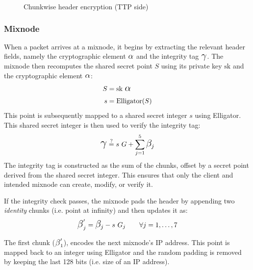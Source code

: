 \begin{figure}[H]
    \centering
    \resizebox{0.9\linewidth}{!}{}
    \caption{Chunkwise header encryption (TTP side)}
    \label{fig:chunked_schema}
\end{figure}


\subsubsection{Mixnode}


When a packet arrives at a mixnode, it begins by extracting the relevant header fields, namely the cryptographic element $ \ALPHA $ and the integrity tag $ \GAMMA $.  
The mixnode then recomputes the shared secret point $ S $ using its private key $ \text{sk} $ and the cryptographic element $ \ALPHA $:  
\begin{equation}
\begin{aligned}
    S &= \text{sk} \ \ALPHA \\
    s &= \text{Elligator}(S)\\
\end{aligned}
\label{eq:derive_secret}
\end{equation}
This point is subsequently mapped to a shared secret integer $ s $ using Elligator.
This shared secret integer is then used to verify the integrity tag: 
\begin{equation}
\GAMMA \overset{\text{?}}{=} s \ G + \sum_{j=1}^{5} \BETA_j
\label{eq:integrity_check}
\end{equation}
The integrity tag is constructed as the sum of the chunks, offset by a secret point derived from the shared secret integer. 
This ensures that only the client and intended mixnode can create, modify, or verify it.

\noindent If the integrity check passes, the mixnode pads the header by appending two \textit{identity} chunks (i.e. point at infinity) and then updates it as:
\begin{equation}
\BETA'_j = \BETA_j - s \ G_j \qquad \forall j = 1, \dots, 7
\label{eq:decrypt}
\end{equation}

The first chunk ($ \BETA'_1 $), encodes the next mixnode’s IP address. 
This point is mapped back to an integer using Elligator and the random padding is removed by keeping the last 128 bits (i.e. size of an IP address).


